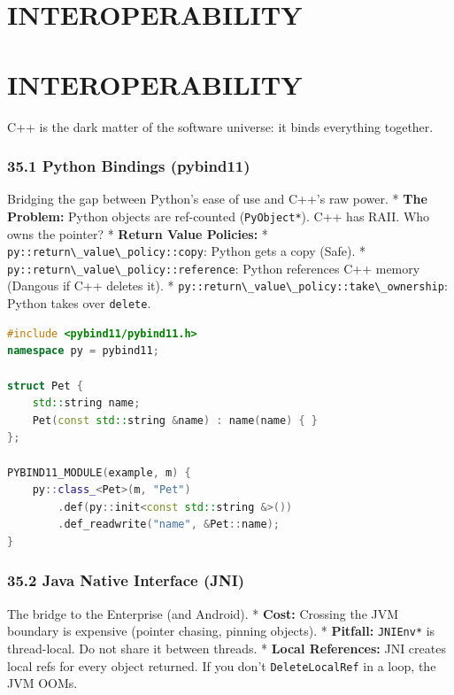 \hypertarget{interoperability}{%
\chapter{INTEROPERABILITY}\label{interoperability}}

\hypertarget{interoperability-1}{%
\chapter{INTEROPERABILITY}\label{interoperability-1}}

C++ is the dark matter of the software universe: it binds everything
together.

\hypertarget{python-bindings-pybind11}{%
\subsection{35.1 Python Bindings
(pybind11)}\label{python-bindings-pybind11}}

Bridging the gap between Python's ease of use and C++'s raw power. *
\textbf{The Problem:} Python objects are ref-counted
(\passthrough{\lstinline!PyObject*!}). C++ has RAII. Who owns the
pointer? * \textbf{Return Value Policies:} *
\passthrough{\lstinline!py::return\_value\_policy::copy!}: Python gets a
copy (Safe). *
\passthrough{\lstinline!py::return\_value\_policy::reference!}: Python
references C++ memory (Dangous if C++ deletes it). *
\passthrough{\lstinline!py::return\_value\_policy::take\_ownership!}:
Python takes over \passthrough{\lstinline!delete!}.

\begin{lstlisting}[language={C++}]
#include <pybind11/pybind11.h>
namespace py = pybind11;

struct Pet {
    std::string name;
    Pet(const std::string &name) : name(name) { }
};

PYBIND11_MODULE(example, m) {
    py::class_<Pet>(m, "Pet")
        .def(py::init<const std::string &>())
        .def_readwrite("name", &Pet::name);
}
\end{lstlisting}

\hypertarget{java-native-interface-jni}{%
\subsection{35.2 Java Native Interface
(JNI)}\label{java-native-interface-jni}}

The bridge to the Enterprise (and Android). * \textbf{Cost:} Crossing
the JVM boundary is expensive (pointer chasing, pinning objects). *
\textbf{Pitfall:} \passthrough{\lstinline!JNIEnv*!} is thread-local. Do
not share it between threads. * \textbf{Local References:} JNI creates
local refs for every object returned. If you don't
\passthrough{\lstinline!DeleteLocalRef!} in a loop, the JVM OOMs.

